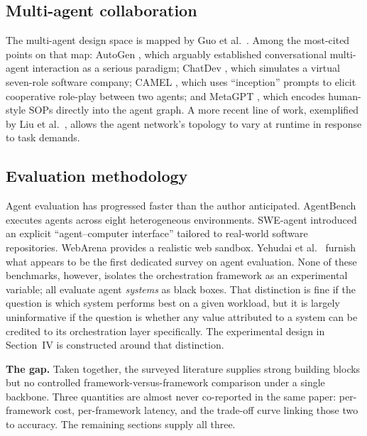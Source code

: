 \documentclass[conference]{IEEEtran}
\begin{document}
\subsection{Multi-agent collaboration}
The multi-agent design space is mapped by Guo et al.\
\cite{guo2024multiagent}. Among the most-cited points on that map:
AutoGen \cite{wu2024autogen}, which arguably established conversational
multi-agent interaction as a serious paradigm; ChatDev
\cite{qian2024chatdev}, which simulates a virtual seven-role software
company; CAMEL \cite{li2023camel}, which uses ``inception'' prompts to
elicit cooperative role-play between two agents; and MetaGPT
\cite{hong2024metagpt}, which encodes human-style SOPs directly into
the agent graph. A more recent line of work, exemplified by Liu et
al.\ \cite{liu2024dynamicllmagent}, allows the agent network's topology
to vary at runtime in response to task demands.

\subsection{Evaluation methodology}
Agent evaluation has progressed faster than the author anticipated.
AgentBench \cite{liu2024agentbench} executes agents across eight
heterogeneous environments. SWE-agent \cite{yang2024sweagent}
introduced an explicit ``agent--computer interface'' tailored to
real-world software repositories. WebArena \cite{zhou2024webarena}
provides a realistic web sandbox. Yehudai et al.\
\cite{yehudai2025evalsurvey} furnish what appears to be the first
dedicated survey on agent evaluation. None of these benchmarks,
however, isolates the orchestration framework as an experimental
variable; all evaluate agent \emph{systems} as black boxes. That
distinction is fine if the question is which system performs best on a
given workload, but it is largely uninformative if the question is
whether any value attributed to a system can be credited to its
orchestration layer specifically. The experimental design in
Section~IV is constructed around that distinction.

\textbf{The gap.} Taken together, the surveyed literature supplies
strong building blocks but no controlled framework-versus-framework
comparison under a single backbone. Three quantities are almost never
co-reported in the same paper: per-framework cost, per-framework
latency, and the trade-off curve linking those two to accuracy. The
remaining sections supply all three.

\end{document}
